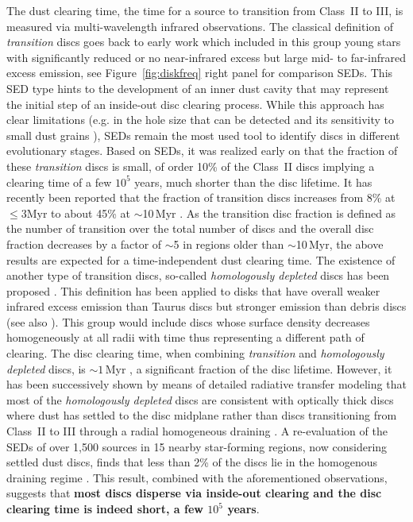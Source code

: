 \documentclass{rsos}
\begin{document}
The  dust clearing time, the time for a source to transition from Class~II to III, is measured via multi-wavelength infrared observations.
The classical definition of {\it transition} discs goes back to early work \cite{1989AJ.....97.1451S} which included in this group young stars with significantly reduced or no near-infrared excess but large mid- to far-infrared excess emission, see Figure~\ref{fig:diskfreq} right panel for comparison SEDs. This SED type hints to the development of an inner dust cavity that may represent the initial step of an inside-out disc clearing process. While this approach has clear limitations (e.g. in the hole size that can be detected and its sensitivity to small dust grains \cite{2009ApJ...703.1964F, 2014prpl.conf..497E}), SEDs remain the most used tool to identify discs in different evolutionary stages. Based on SEDs, it was realized early on that the fraction of these {\it transition} discs is small, of order 10\% of the Class~II discs 
\cite{1990AJ.....99.1187S} implying a clearing time of a  few $10^5$ years, much shorter than the disc lifetime. It has recently been reported that the  fraction of transition discs increases from 8\% at $\leq$3Myr to about 45\% at $\sim$10\,Myr \cite{2016ApJ...832...87B}.
As the transition disc fraction is defined as the number of transition over the total number of discs and the overall disc fraction decreases by a factor of $\sim$5 in regions older than $\sim$10\,Myr, the above %
results are expected for a time-independent dust clearing time. The existence of another type of transition discs, so-called
{\it homologously depleted} discs has been proposed \cite{2009ApJ...698....1C}. This definition has been applied to disks that have overall weaker infrared excess emission than Taurus discs but stronger emission than debris discs (see also \cite{2010ApJ...708.1107M}). This group would include discs whose surface density decreases homogeneously at all radii with time thus representing a different path of clearing. The disc clearing time, when combining {\it transition} and {\it homologously depleted} discs, is $\sim1$\,Myr 
\cite{2009AJ....138..703C}, a significant fraction of the disc lifetime.
However, it has been successively shown by means of detailed radiative transfer modeling that most of the {\it homologously depleted} discs are consistent with optically thick discs where dust has settled to the disc midplane rather than discs transitioning from Class~II to III through a radial homogeneous draining \cite{2011MNRAS.410..671E}. A re-evaluation of the SEDs of over 1,500 sources in 15 nearby star-forming regions, now considering settled dust discs, finds that less than 2\% of the discs lie in the homogenous draining regime  \cite{2013MNRAS.428.3327K}. This result, combined with the aforementioned observations, suggests that {\bf most discs disperse via inside-out clearing and the disc clearing time is indeed short, a few $10^5$ years}.
\end{document}
